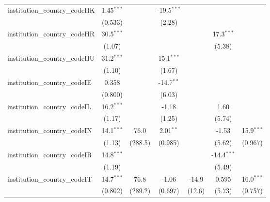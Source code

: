 \begin{tabular}{lcccccc}
   institution\_country\_codeHK          & 1.45$^{***}$  &              & -19.5$^{***}$ &               &               &   \\   
                                         & (0.533)       &              & (2.28)        &               &               &   \\   
   institution\_country\_codeHR          & 30.5$^{***}$  &              &               &               & 17.3$^{***}$  &   \\   
                                         & (1.07)        &              &               &               & (5.38)        &   \\   
   institution\_country\_codeHU          & 31.2$^{***}$  &              & 15.1$^{***}$  &               &               &   \\   
                                         & (1.10)        &              & (1.67)        &               &               &   \\   
   institution\_country\_codeIE          & 0.358         &              & -14.7$^{**}$  &               &               &   \\   
                                         & (0.800)       &              & (6.03)        &               &               &   \\   
   institution\_country\_codeIL          & 16.2$^{***}$  &              & -1.18         &               & 1.60          &   \\   
                                         & (1.17)        &              & (1.25)        &               & (5.74)        &   \\   
   institution\_country\_codeIN          & 14.1$^{***}$  & 76.0         & 2.01$^{**}$   &               & -1.53         & 15.9$^{***}$\\   
                                         & (1.13)        & (288.5)      & (0.985)       &               & (5.62)        & (0.967)\\   
   institution\_country\_codeIR          & 14.8$^{***}$  &              &               &               & -14.4$^{***}$ &   \\   
                                         & (1.19)        &              &               &               & (5.49)        &   \\   
   institution\_country\_codeIT          & 14.7$^{***}$  & 76.8         & -1.06         & -14.9         & 0.595         & 16.0$^{***}$\\   
                                         & (0.802)       & (289.2)      & (0.697)       & (12.6)        & (5.73)        & (0.757)\\   

\end{tabular}
